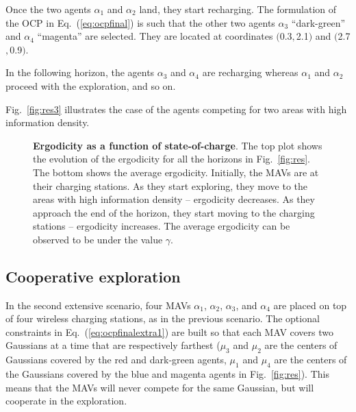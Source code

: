 \documentclass[letterpaper,10pt,conference,twoside]{IEEEtran}
\theoremstyle{definition}
\begin{document}
Once the two agents $\alpha_1$ and $\alpha_2$ land, they start recharging. The formulation of the OCP in Eq.~(\ref{eq:ocpfinal}) is such that the other two agents $\alpha_3$ ``dark-green'' and $\alpha_4$ ``magenta'' are selected. They are located at coordinates $($0.3$,$2.1$)$ and $($2.7$,$0.9$)$.%

In the following horizon, the agents $\alpha_3$ and $\alpha_4$ are recharging whereas $\alpha_1$ and $\alpha_2$ proceed with the exploration, %
and so on.

Fig.~\ref{fig:res3} illustrates the case of the agents competing for two areas with high information density.

\begin{figure}[t!]
  \begin{minipage}[t!]{.5\columnwidth}
    \vspace*{-.2cm}
    
  \end{minipage}
  \begin{minipage}[c]{.48\columnwidth}
    \vspace*{.05cm}
    \caption{\textbf{Ergodicity %
    as a function of state-of-charge}. The top plot shows the evolution of the ergodicity for all the horizons in Fig.~\ref{fig:res}. The bottom shows the average ergodicity. Initially, the MAVs are at their charging stations. As they start exploring, they move to the areas with high information density -- ergodicity decreases. As they approach the end of the horizon, they start moving to the charging stations -- ergodicity increases. The average ergodicity can be observed to be under the value $\gamma$.}
    \label{fig:ergo}
  \end{minipage}
  \vspace*{-.4cm}
\end{figure}

\subsection*{Cooperative exploration}
\noindent
In the second extensive scenario, four MAVs $\alpha_1$, $\alpha_2$, $\alpha_3$, and $\alpha_4$ are placed on top of four wireless charging stations, as in the previous scenario. The optional constraints in Eq.~(\ref{eq:ocpfinalextra1}) are built so that each MAV covers two Gaussians at a time that are respectively farthest ($\mu_3$ and $\mu_2$ are the centers of Gaussians covered by the red and dark-green agents, $\mu_1$ and $\mu_4$ are the centers of the Gaussians covered by the blue and magenta agents in Fig.~\ref{fig:res}). This means that the MAVs will never compete for the same Gaussian, but will cooperate in the exploration. %
\end{document}
